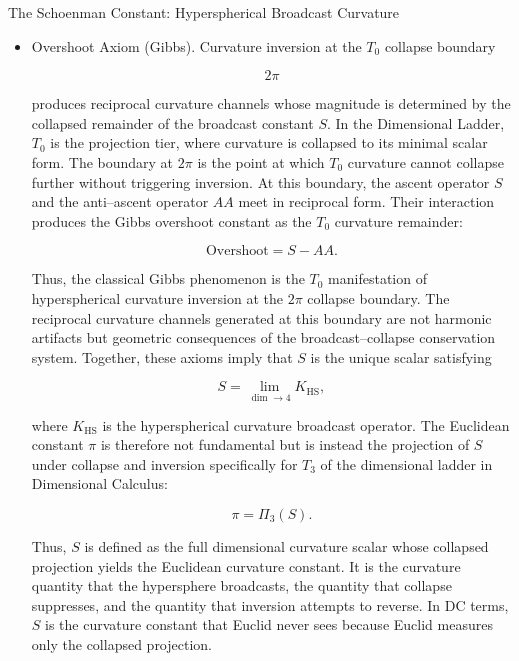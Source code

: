 \documentclass[final,onefignum,onetabnum]{siamart}
\begin{document}
\begin{section}{The Schoenman Constant: Hyperspherical Broadcast Curvature}
\begin{itemize}
\[
\lvert S(T_{n}) \rvert + \lvert AA(T_{n}) \rvert = \text{constant curvature content},
\]


independent of operator dominance, gamma stabilization, collapse dynamics, or cosmogenesis rebound. Collapse cannot destroy curvature, cannot create curvature, and cannot violate the primitive metric. The Collapse Axiom therefore represents the downward half of the broadcast--collapse conservation system, ensuring that all curvature phenomena---including gravity, inversion, collapse, and cosmogenesis---remain fully compatible with the inherited curvature substrate.
\medskip
    \item Overshoot Axiom (Gibbs). Curvature inversion at the $T_0$ collapse boundary


\[
2\pi
\]


produces reciprocal curvature channels whose magnitude is determined by the collapsed remainder of the broadcast constant $S$. In the Dimensional Ladder, $T_0$ is the projection tier, where curvature is collapsed to its minimal scalar form. The boundary at $2\pi$ is the point at which $T_0$ curvature cannot collapse further without triggering inversion. At this boundary, the ascent operator $S$ and the anti--ascent operator $AA$ meet in reciprocal form. Their interaction produces the Gibbs overshoot constant as the $T_0$ curvature remainder:


\[
\text{Overshoot} = S - AA.
\]


Thus, the classical Gibbs phenomenon is the $T_0$ manifestation of hyperspherical curvature inversion at the $2\pi$ collapse boundary. The reciprocal curvature channels generated at this boundary are not harmonic artifacts but geometric consequences of the broadcast--collapse conservation system. Together, these axioms imply that $S$ is the unique scalar satisfying


\[
S = \lim_{\dim \to 4} K_{\mathrm{HS}},
\]


where $K_{\mathrm{HS}}$ is the hyperspherical curvature broadcast operator. The Euclidean constant $\pi$ is therefore not fundamental but is instead the projection of $S$ under collapse and inversion specifically for $T_3$ of the dimensional ladder in Dimensional Calculus:


\[
\pi = \Pi_{3}(S).
\]


Thus, $S$ is defined as the full dimensional curvature scalar whose collapsed projection yields the Euclidean curvature constant. It is the curvature quantity that the hypersphere broadcasts, the quantity that collapse suppresses, and the quantity that inversion attempts to reverse. In DC terms, $S$ is the curvature constant that Euclid never sees because Euclid measures only the collapsed projection.
\end{itemize}


\end{section}
\end{document}

